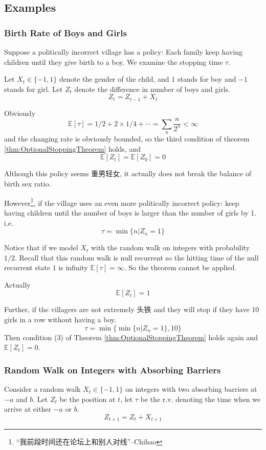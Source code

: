     \subsection{Examples}
        \subsubsection{Birth Rate of Boys and Girls}
            Suppose a politically incorrect village has a policy: Each family keep having children until they give birth to a boy. We examine the stopping time $\tau$.

            Let $X_t \in \{-1, 1\}$ denote the gender of the child, and $1$ stands for boy and $-1$ stands for girl. Let $Z_t$ denote the difference in number of boys and girls.
            \[ Z_t = Z_{t-1} + X_t \]

            Obviously
            \[ \mathbb{E}[\tau] = 1/2 + 2 \times 1/4 + \cdots = \sum_n \frac{n}{2^n} < \infty \]
            and the changing rate is obviously bounded, so the third condition of theorem \ref{thm:OptionalStoppingTheorem} holds, and
            \[ \mathbb{E}[Z_t] = \mathbb{E}[Z_0] = 0 \]

            Although this policy seems 重男轻女, it actually does not break the balance of birth sex ratio.

            However\footnote{“我前段时间还在论坛上和别人对线”--Chihao}, if the village uses an even more politically incorrect policy: keep having children until the number of boys is larger than the number of girls by 1. i.e.
            \[ \tau = \min\{n|Z_n=1\} \]
            
            Notice that if we model $X_t$ with the random walk on integers with probability $1/2$. Recall that this random walk is null recurrent so the hitting time of the null recurrent state $1$ is infinity $\mathbb{E}[\tau] = \infty$. So the theorem cannot be applied.
            
            Actually
            \[ \mathbb{E}[Z_t] = 1 \]

            Further, if the villagers are not extremely 头铁 and they will stop if they have 10 girls in a row without having a boy.
            \[ \tau = \min\{\min\{n|Z_n=1\}, 10\} \]
            Then condition (3) of Theorem \ref{thm:OptionalStoppingTheorem} holds again and $\mathbb{E}[Z_t] = 0$.

        \subsubsection{Random Walk on Integers with Absorbing Barriers}
            Consider a random walk $X_t \in \{-1, 1\}$ on integers with two absorbing barriers at $-a$ and $b$. Let $Z_t$ be the position at $t$, let $\tau$ be the r.v. denoting the time when we arrive at either $-a$ or $b$.
            \[ Z_{t+1} = Z_t + X_{t+1} \]

